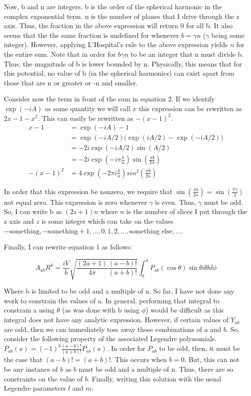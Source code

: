 \begin{homeworkProblem}[Jackson 3rd ed. : 3.4a]
Now, b and n are integers. b is the order of the spherical harmonic in the complex exponential term. n is the number of planes that I drive through the z axis. Thus, the fraction in the above expression will return 0 for all b. It also seems that the the same fraction is undefined for whenever $b = \gamma n$ ($\gamma$ being some integer). However, applying L'Hospital's rule to the above expression yields $n$ for the entire sum. Note that in order for $b \gamma n$ to be an integer that n must divide b. Thus, the magnitude of b is lower bounded by n. Physically, this means that for this potential, no value of b (in the spherical harmonics) can exist apart from those that are n or greater or -n and smaller.
\\ \par
Consider now the term in front of the sum in equation 2. If we identify $\exp(-iA)$ as some quantity we will call $x$ this expression can be rewritten as $2x-1-x^2$. This can easily be rewritten as $-(x-1)^2$. 
\begin{align}
x-1 &= \exp(-iA)-1  \nonumber \\
&= \exp(-iA/2)\big(\exp(iA/2)-\exp(-iA/2)\big) \nonumber \\
&= -2i\exp(-iA/2)\sin(A/2) \nonumber \\
&= -2i\exp(-i\pi\frac{b}{n})\sin(\frac{\pi b}{2n}) \nonumber \\
-(x-1)^2 &= 4\exp(-2\pi i \frac{b}{n})sin^2(\frac{\pi b}{2 n}) \nonumber
\end{align}

In order that this expression be nonzero, we require that $\sin(\frac{\pi b}{2n})=\sin(\frac{\pi \gamma}{2})$ not equal zero. This expression is zero whenever $\gamma$ is even. Thus, $\gamma$ must be odd. So, I can write b as $(2z+1)n$ where $n$ is the number of slices I put through the z axis and $z$ is some integer which can take on the values $-\text{something},-\text{something}+1,...,0,1,2,...,\text{something else},...$.

Finally, I can rewrite equation 1 as follows:

\[
A_{ab} R^k = \frac{iV}{b} \sqrt{\frac{(2a+1)}{4\pi}\frac{(a-b)!}{(a+b)!}} \int_0^\pi  P_{ab}(\cos\theta)\sin\theta d\theta d\phi
\]

Where b is limited to be odd and a multiple of n. So far, I have not done any work to constrain the values of a. In general, performing that integral to constrain a using $\theta$ (as was done with b using $\phi$) would be difficult as this integral does not have any analytic expression. However, if certain values of $Y_{ab}$ are odd, then we can immediately toss away those combinations of $a$ and $b$. So, consider the following property of the associated Legendre polynomials. $P_{ab}(x) = (-1)^b\frac{(a-b)!}{(a+b)!}P_{ab}(x)$. In order for $P_{ab}$ to be odd, then, it must be the case that $(a-b)!=(a+b)!$. This occurs when $b=0$. But, this can not be any instance of $b$ as $b$ must be odd and a multiple of n. Thus, there are so constraints on the value of $b$. Finally, writing this solution with the usual Legendre parameters $l$ and $m$:


\end{homeworkProblem}
